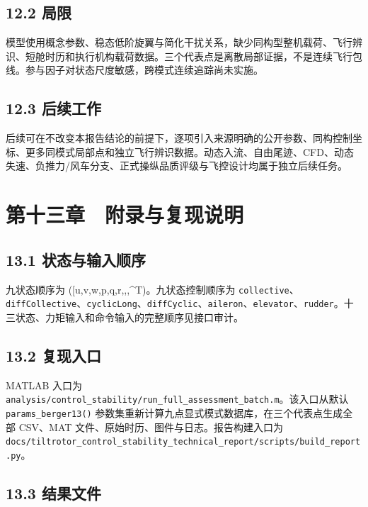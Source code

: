 \documentclass[UTF8,11pt,oneside,openany,fontset=windows]{ctexbook}
\begin{document}
\section{12.2 局限}\label{ux5c40ux9650}

模型使用概念参数、稳态低阶旋翼与简化干扰关系，缺少同构型整机载荷、飞行辨识、短舱时历和执行机构载荷数据。三个代表点是离散局部证据，不是连续飞行包线。参与因子对状态尺度敏感，跨模式连续追踪尚未实施。

\section{12.3 后续工作}\label{ux540eux7eedux5de5ux4f5c}

后续可在不改变本报告结论的前提下，逐项引入来源明确的公开参数、同构控制坐标、更多同模式局部点和独立飞行辨识数据。动态入流、自由尾迹、CFD、动态失速、负推力/风车分支、正式操纵品质评级与飞控设计均属于独立后续任务。

\chapter{第十三章　附录与复现说明}\label{ux7b2cux5341ux4e09ux7ae0-ux9644ux5f55ux4e0eux590dux73b0ux8bf4ux660e}

\section{13.1
状态与输入顺序}\label{ux72b6ux6001ux4e0eux8f93ux5165ux987aux5e8f}

九状态顺序为 ({[}u,v,w,p,q,r,\phi,\theta,\psi{]}\^{}T)。九状态控制顺序为
\texttt{collective}、\texttt{diffCollective}、\texttt{cyclicLong}、\texttt{diffCyclic}、\texttt{aileron}、\texttt{elevator}、\texttt{rudder}。十三状态、力矩输入和命令输入的完整顺序见接口审计。

\section{13.2 复现入口}\label{ux590dux73b0ux5165ux53e3}

MATLAB 入口为
\texttt{analysis/control\_stability/run\_full\_assessment\_batch.m}。该入口从默认
\texttt{params\_berger13()}
参数集重新计算九点显式模式数据库，在三个代表点生成全部 CSV、MAT
文件、原始时历、图件与日志。报告构建入口为
\texttt{docs/tiltrotor\_control\_stability\_technical\_report/scripts/build\_report.py}。

\section{13.3 结果文件}\label{ux7ed3ux679cux6587ux4ef6}
\end{document}
